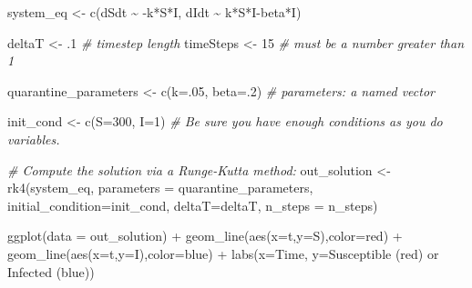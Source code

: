 \documentclass[
]{book}
\newenvironment{Shaded}{\begin{snugshade}}{\end{snugshade}}
\newcommand{\AttributeTok}[1]{\textcolor[rgb]{0.77,0.63,0.00}{#1}}
\newcommand{\CommentTok}[1]{\textcolor[rgb]{0.56,0.35,0.01}{\textit{#1}}}
\newcommand{\DecValTok}[1]{\textcolor[rgb]{0.00,0.00,0.81}{#1}}
\newcommand{\FunctionTok}[1]{\textcolor[rgb]{0.00,0.00,0.00}{#1}}
\newcommand{\NormalTok}[1]{#1}
\newcommand{\OtherTok}[1]{\textcolor[rgb]{0.56,0.35,0.01}{#1}}
\newcommand{\SpecialCharTok}[1]{\textcolor[rgb]{0.00,0.00,0.00}{#1}}
\newcommand{\StringTok}[1]{\textcolor[rgb]{0.31,0.60,0.02}{#1}}
\theoremstyle{definition}
\theoremstyle{definition}
\theoremstyle{definition}
\theoremstyle{remark}
\begin{document}
\begin{Shaded}
\begin{Highlighting}[]
\NormalTok{system\_eq }\OtherTok{\textless{}{-}} \FunctionTok{c}\NormalTok{(dSdt }\SpecialCharTok{\textasciitilde{}} \SpecialCharTok{{-}}\NormalTok{k}\SpecialCharTok{*}\NormalTok{S}\SpecialCharTok{*}\NormalTok{I,}
\NormalTok{               dIdt }\SpecialCharTok{\textasciitilde{}}\NormalTok{ k}\SpecialCharTok{*}\NormalTok{S}\SpecialCharTok{*}\NormalTok{I}\SpecialCharTok{{-}}\NormalTok{beta}\SpecialCharTok{*}\NormalTok{I)}


\NormalTok{deltaT }\OtherTok{\textless{}{-}}\NormalTok{ .}\DecValTok{1}    \CommentTok{\# timestep length}
\NormalTok{timeSteps }\OtherTok{\textless{}{-}} \DecValTok{15}   \CommentTok{\# must be a number greater than 1}

\NormalTok{quarantine\_parameters }\OtherTok{\textless{}{-}} \FunctionTok{c}\NormalTok{(}\AttributeTok{k=}\NormalTok{.}\DecValTok{05}\NormalTok{, }\AttributeTok{beta=}\NormalTok{.}\DecValTok{2}\NormalTok{)   }\CommentTok{\# parameters: a named vector}

\NormalTok{init\_cond }\OtherTok{\textless{}{-}} \FunctionTok{c}\NormalTok{(}\AttributeTok{S=}\DecValTok{300}\NormalTok{, }\AttributeTok{I=}\DecValTok{1}\NormalTok{)  }\CommentTok{\# Be sure you have enough conditions as you do variables.}

\CommentTok{\# Compute the solution via a Runge{-}Kutta method:}
\NormalTok{out\_solution }\OtherTok{\textless{}{-}} \FunctionTok{rk4}\NormalTok{(system\_eq,}
                      \AttributeTok{parameters =}\NormalTok{ quarantine\_parameters,}
                      \AttributeTok{initial\_condition=}\NormalTok{init\_cond,}
                      \AttributeTok{deltaT=}\NormalTok{deltaT,}
                      \AttributeTok{n\_steps =}\NormalTok{ n\_steps)}


\FunctionTok{ggplot}\NormalTok{(}\AttributeTok{data =}\NormalTok{ out\_solution) }\SpecialCharTok{+}
  \FunctionTok{geom\_line}\NormalTok{(}\FunctionTok{aes}\NormalTok{(}\AttributeTok{x=}\NormalTok{t,}\AttributeTok{y=}\NormalTok{S),}\AttributeTok{color=}\StringTok{\textquotesingle{}red\textquotesingle{}}\NormalTok{) }\SpecialCharTok{+}
  \FunctionTok{geom\_line}\NormalTok{(}\FunctionTok{aes}\NormalTok{(}\AttributeTok{x=}\NormalTok{t,}\AttributeTok{y=}\NormalTok{I),}\AttributeTok{color=}\StringTok{\textquotesingle{}blue\textquotesingle{}}\NormalTok{) }\SpecialCharTok{+}
  \FunctionTok{labs}\NormalTok{(}\AttributeTok{x=}\StringTok{\textquotesingle{}Time\textquotesingle{}}\NormalTok{,}
       \AttributeTok{y=}\StringTok{\textquotesingle{}Susceptible (red) or Infected (blue)\textquotesingle{}}\NormalTok{)}
\end{Highlighting}
\end{Shaded}
\end{document}
